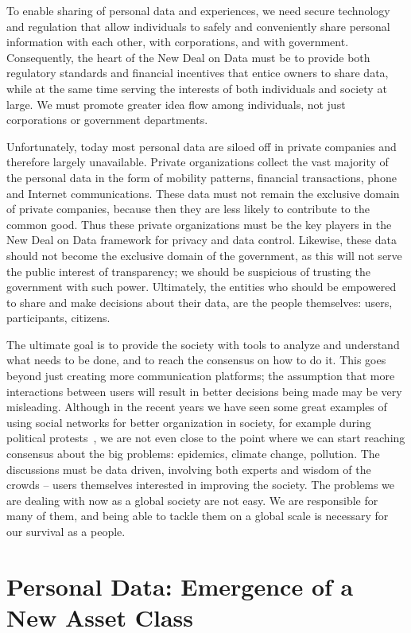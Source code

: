To enable sharing of personal data and experiences, we need secure technology and regulation that allow individuals to safely and conveniently share personal information with each other, with corporations, and with government.
Consequently, the heart of the New Deal on Data must be to provide both regulatory standards and financial incentives that entice owners to share data, while at the same time serving the interests of both individuals and society at large.
We must promote greater idea flow among individuals, not just corporations or government departments.

Unfortunately, today most personal data are siloed off in private companies and therefore largely unavailable.
Private organizations collect the vast majority of the personal data in the form of mobility patterns, financial transactions, phone and Internet communications.
These data must not remain the exclusive domain of private companies, because then they are less likely to contribute to the common good.
Thus these private organizations must be the key players in the New Deal on Data framework for privacy and data control.
Likewise, these data should not become the exclusive domain of the government, as this will not serve the public interest of transparency; we should be suspicious of trusting the government with such power.
Ultimately, the entities who should be empowered to share and make decisions about their data, are the people themselves: users, participants, citizens.

The ultimate goal is to provide the society with tools to analyze and understand what needs to be done, and to reach the consensus on how to do it.
This goes beyond just creating more communication platforms; the assumption that more interactions between users will result in better decisions being made may be very misleading. 
Although in the recent years we have seen some great examples of using social networks for better organization in society, for example during political protests~\cite{grossman2009iran, barry2009protests}, we are not even close to the point where we can start reaching consensus about the big problems: epidemics, climate change, pollution.
The discussions must be data driven, involving both experts and wisdom of the crowds -- users themselves interested in improving the society.
The problems we are dealing with now as a global society are not easy. 
We are responsible for many of them, and being able to tackle them on a global scale is necessary for our survival as a people.

\section{Personal Data: Emergence of a New Asset Class }

